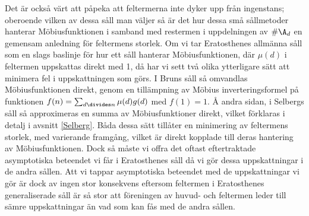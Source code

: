 Det är också värt att påpeka att feltermerna inte dyker upp från ingenstans; oberoende vilken av dessa såll man väljer så är det hur dessa små sållmetoder hanterar Möbiusfunktionen i samband med restermen i uppdelningen av \(\#\A_d\) en gemensam anledning för feltermens storlek.
Om vi tar Eratosthenes allmänna såll som en slags baslinje för hur ett såll hanterar Möbiusfunktionen, där \(\mu(d)\) i feltermen uppskattas direkt med 1, då har vi sett två olika ytterligare sätt att minimera fel i uppskattningen som görs. 
I Bruns såll så omvandlas Möbiusfunktionen direkt, genom en tillämpning av Möbius inverteringsformel på funktionen \(f(n) = \sum_{d\divides n}\mu(d)g(d)\) med \(f(1) = 1\). 
Å andra sidan, i Selbergs såll så approximeras en summa av Möbiusfunktioner direkt, vilket förklaras i detalj i avsnitt \ref{Selberg}.
Båda dessa sätt tillåter en minimering av feltermens storlek, med varierande framgång, vilket är direkt kopplade till deras hantering av Möbiusfunktionen.
Dock så måste vi offra det oftast eftertraktade asymptotiska beteendet vi får i Eratosthenes såll då vi gör dessa uppskattningar i de andra sållen.
Att vi tappar asymptotiska beteendet med de uppskattningar vi gör är dock av ingen stor konsekvens eftersom feltermen i Eratosthenes generaliserade såll är så stor att föreningen av huvud- och feltermen leder till sämre uppskattningar än vad som kan fås med de andra sållen.



